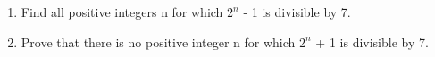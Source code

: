\item 
\begin{enumerate}
\item Find all positive integers n for which $2^n$ - 1 is divisible by 7.
\item Prove that there is no positive integer n for which $2^n$ + 1 is divisible by 7.
\end{enumerate}

